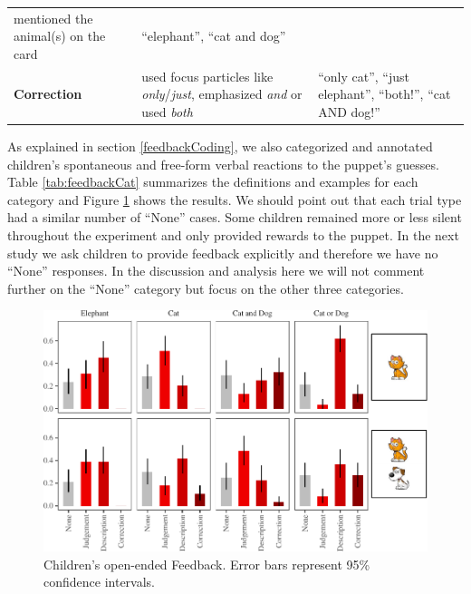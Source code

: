\documentclass[floatsintext,man]{apa6}
\theoremstyle{definition}
\theoremstyle{definition}
\theoremstyle{definition}
\theoremstyle{remark}
\begin{document}
\begin{longtable}[]{@{}lll@{}}
\begin{minipage}[t]{0.46\columnwidth}
mentioned the animal(s) on the card\strut
\end{minipage} & \begin{minipage}[t]{0.32\columnwidth}\raggedright\strut
\enquote{elephant}, \enquote{cat and dog}\strut
\end{minipage}\tabularnewline
\begin{minipage}[t]{0.11\columnwidth}\raggedright\strut
\textbf{Correction}\strut
\end{minipage} & \begin{minipage}[t]{0.46\columnwidth}\raggedright\strut
used focus particles like \emph{only}/\emph{just}, emphasized \emph{and}
or used \emph{both}\strut
\end{minipage} & \begin{minipage}[t]{0.32\columnwidth}\raggedright\strut
\enquote{only cat}, \enquote{just elephant}, \enquote{both!},
\enquote{cat AND dog!}\strut
\end{minipage}\tabularnewline
\bottomrule
\end{longtable}

As explained in section \ref{feedbackCoding}, we also categorized and
annotated children's spontaneous and free-form verbal reactions to the
puppet's guesses. Table \ref{tab:feedbackCat} summarizes the definitions
and examples for each category and Figure \ref{fig:feedbackData} shows
the results. We should point out that each trial type had a similar
number of \enquote{None} cases. Some children remained more or less
silent throughout the experiment and only provided rewards to the
puppet. In the next study we ask children to provide feedback explicitly
and therefore we have no \enquote{None} responses. In the discussion and
analysis here we will not comment further on the \enquote{None} category
but focus on the other three categories.

\begin{figure}
\centering
\includegraphics{figs/feedbackData-1.pdf}
\caption{\label{fig:feedbackData}Children's open-ended Feedback. Error bars
represent 95\% confidence intervals.}
\end{figure}
\end{document}
